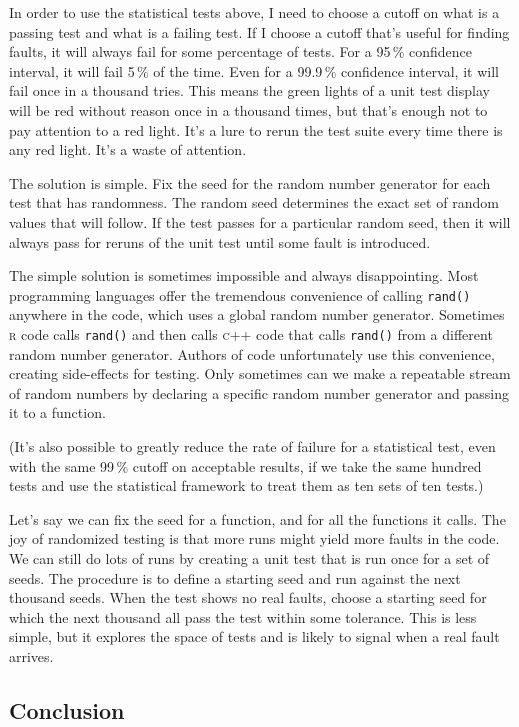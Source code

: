 \documentclass[fleqn,10pt]{olplainarticle}
\newcommand{\rlang}{\textsc{r}\xspace}
\newcommand{\cpp}{\textsc{c}++\xspace}
\begin{document}
In order to use the statistical tests above, I need to choose
a cutoff on what is a passing test and what is a failing test.
If I choose a cutoff that's useful for finding faults, it will
always fail for some percentage of tests. For a 95\,\% confidence
interval, it will fail 5\,\% of the time. Even for a
99.9\,\% confidence interval, it will fail once in a thousand
tries. This means the green lights of a unit test display will
be red without reason once in a thousand times, but that's
enough not to pay attention to a red light. It's a lure to
rerun the test suite every time there is any red light.
It's a waste of attention.

The solution is simple. Fix the seed for the random number
generator for each test that has randomness. The random
seed determines the exact set of random values that will
follow. If the test passes for a particular random seed,
then it will always pass for reruns of the unit test until
some fault is introduced.

The simple solution is sometimes impossible and always
disappointing. Most programming languages offer the tremendous
convenience of calling \lstinline!rand()! anywhere in the
code, which uses a global random number generator. Sometimes
\rlang code calls \lstinline!rand()! and then calls \cpp code
that calls \lstinline!rand()! from a different random number
generator. Authors
of code unfortunately use this convenience, creating side-effects
for testing. Only sometimes can we make a repeatable
stream of random numbers by declaring a specific random number generator
and passing it to a function.

(It's also possible to greatly reduce the rate of failure
for a statistical test, even with the same 99\,\% cutoff
on acceptable results, if we take the same hundred tests
and use the statistical framework to treat them as ten sets
of ten tests.)

Let's say we can fix the seed for a function, and for all the
functions it calls. The joy of randomized testing is that more
runs might yield more faults in the code. We
can still do lots of runs by creating a unit test that is run once
for a set of seeds.  The procedure is to define a starting seed and run against
the next thousand seeds. When the test shows no real faults,
choose a starting seed for which the next thousand all pass
the test within some tolerance. This is less simple, but it
explores the space of tests and is likely to signal when
a real fault arrives.

\subsection{Conclusion}
\end{document}
